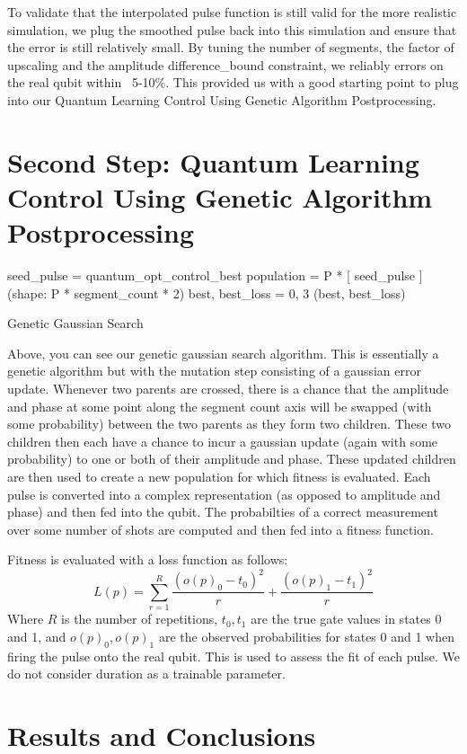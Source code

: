 \documentclass{article}
\begin{document}
To validate that the interpolated pulse function is still valid for the more realistic simulation, we plug 
the smoothed pulse back into this simulation and ensure that the error is still relatively small. By 
tuning the number of segments, the factor of upscaling and the amplitude difference\_bound constraint, 
we reliably errors on the real qubit within ~5-10\%. This provided us with a good starting point to plug 
into our Quantum Learning Control Using Genetic Algorithm Postprocessing.

\section{Second Step: Quantum Learning Control Using Genetic Algorithm Postprocessing}
\begin{algorithm}[H]
\SetAlgoLined
{}
    seed\_pulse = quantum\_opt\_control\_best\;
    population = P * [ seed\_pulse ] (shape: P * segment\_count * 2)\;
    best, best\_loss = 0, 3\;
    \Return (best, best\_loss)
\caption{Genetic Gaussian Search}
\end{algorithm}

Above, you can see our genetic gaussian search algorithm. This is essentially a genetic algorithm
but with the mutation step consisting of a gaussian error update. Whenever two parents are crossed,
there is a chance that the amplitude and phase at some point along the segment count axis will be swapped
(with some probability)
between the two parents as they form two children. These two children then each have a chance to incur 
a gaussian update (again with some probability) to one or both of their amplitude and phase. These updated
children are then used to create a new population for which fitness is evaluated. Each pulse is
converted into a complex representation (as opposed to amplitude and phase) and then fed into the 
qubit. The probabilties of a correct measurement over some number of shots are computed and then fed into
a fitness function.

Fitness is evaluated with a loss function as follows:
$$L(p) = \sum_{r=1}^R \frac{(o(p)_0 - t_0)^2}{r} + \frac{(o(p)_1 - t_1)^2}{r}$$
Where $R$ is the number of repetitions, $t_0, t_1$ are the true gate values in states 0 and 1, and $o(p)_0, o(p)_1$
are the observed probabilities for states 0 and 1 when firing the pulse onto the real qubit. This is used 
to assess the fit of each pulse. We do not consider duration as a trainable parameter.


\section{Results and Conclusions}
\end{document}

